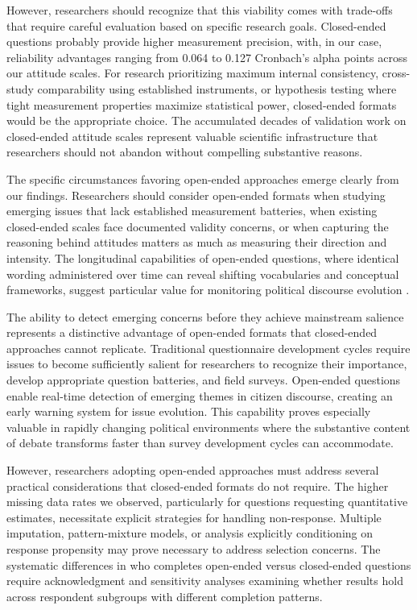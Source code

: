 \documentclass[
  journal=ram,
  manuscript=article-type,
  year=2025,
  volume=unpublished,
]{cup-journal}
\begin{document}
However, researchers should recognize that this viability comes with trade-offs that require careful evaluation based on specific research goals.
Closed-ended questions probably provide higher measurement precision, with, in our case, reliability advantages ranging from 0.064 to 0.127 Cronbach’s alpha points across our attitude scales.
For research prioritizing maximum internal consistency, cross-study comparability using established instruments, or hypothesis testing where tight measurement properties maximize statistical power, closed-ended formats would be the appropriate choice.
The accumulated decades of validation work on closed-ended attitude scales represent valuable scientific infrastructure that researchers should not abandon without compelling substantive reasons.

The specific circumstances favoring open-ended approaches emerge clearly from our findings.
Researchers should consider open-ended formats when studying emerging issues that lack established measurement batteries, when existing closed-ended scales face documented validity concerns, or when capturing the reasoning behind attitudes matters as much as measuring their direction and intensity.
The longitudinal capabilities of open-ended questions, where identical wording administered over time can reveal shifting vocabularies and conceptual frameworks, suggest particular value for monitoring political discourse evolution \citep{geer88}.

The ability to detect emerging concerns before they achieve mainstream salience represents a distinctive advantage of open-ended formats that closed-ended approaches cannot replicate.
Traditional questionnaire development cycles require issues to become sufficiently salient for researchers to recognize their importance, develop appropriate question batteries, and field surveys.
Open-ended questions enable real-time detection of emerging themes in citizen discourse, creating an early warning system for issue evolution.
This capability proves especially valuable in rapidly changing political environments where the substantive content of debate transforms faster than survey development cycles can accommodate.

However, researchers adopting open-ended approaches must address several practical considerations that closed-ended formats do not require.
The higher missing data rates we observed, particularly for questions requesting quantitative estimates, necessitate explicit strategies for handling non-response.
Multiple imputation, pattern-mixture models, or analysis explicitly conditioning on response propensity may prove necessary to address selection concerns.
The systematic differences in who completes open-ended versus closed-ended questions require acknowledgment and sensitivity analyses examining whether results hold across respondent subgroups with different completion patterns.
\end{document}
